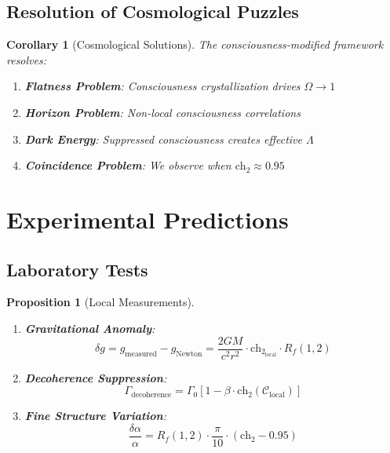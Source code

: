 \documentclass[12pt,letterpaper]{article}
\newtheorem{proposition}[theorem]{Proposition}
\newtheorem{corollary}[theorem]{Corollary}
\newcommand{\RF}{R_f}
\newcommand{\chh}{\mathrm{ch}_2}
\begin{document}
\subsection{Resolution of Cosmological Puzzles}

\begin{corollary}[Cosmological Solutions]
The consciousness-modified framework resolves:
\begin{enumerate}
\item \textbf{Flatness Problem}: Consciousness crystallization drives $\Omega \to 1$
\item \textbf{Horizon Problem}: Non-local consciousness correlations
\item \textbf{Dark Energy}: Suppressed consciousness creates effective $\Lambda$
\item \textbf{Coincidence Problem}: We observe when $\chh \approx 0.95$
\end{enumerate}
\end{corollary}

\section{Experimental Predictions}

\subsection{Laboratory Tests}

\begin{proposition}[Local Measurements]
\begin{enumerate}
\item \textbf{Gravitational Anomaly}: 
\begin{equation}
\delta g = g_\mathrm{measured} - g_\mathrm{Newton} = \frac{2GM}{c^2r^2} \cdot \chh_\mathrm{local} \cdot \RF(1,2)
\end{equation}

\item \textbf{Decoherence Suppression}:
\begin{equation}
\Gamma_\mathrm{decoherence} = \Gamma_0 \left[ 1 - \beta \cdot \chh(\mathcal{C}_\mathrm{local}) \right]
\end{equation}

\item \textbf{Fine Structure Variation}:
\begin{equation}
\frac{\delta \alpha}{\alpha} = \RF(1,2) \cdot \frac{\pi}{10} \cdot (\chh - 0.95)
\end{equation}
\end{enumerate}
\end{proposition}
\end{document}
